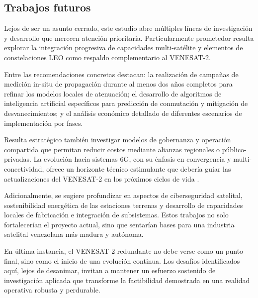 \subsection{Trabajos futuros}

Lejos de ser un asunto cerrado, este estudio abre múltiples líneas de investigación y desarrollo que merecen atención prioritaria. Particularmente prometedor resulta explorar la integración progresiva de capacidades multi-satélite y elementos de constelaciones LEO como respaldo complementario al VENESAT-2.

Entre las recomendaciones concretas destacan: la realización de campañas de medición in-situ de propagación durante al menos dos años completos para refinar los modelos locales de atenuación; el desarrollo de algoritmos de inteligencia artificial específicos para predicción de conmutación y mitigación de desvanecimientos; y el análisis económico detallado de diferentes escenarios de implementación por fases.

Resulta estratégico también investigar modelos de gobernanza y operación compartida que permitan reducir costos mediante alianzas regionales o público-privadas. La evolución hacia sistemas 6G, con su énfasis en convergencia y multi-conectividad, ofrece un horizonte técnico estimulante que debería guiar las actualizaciones del VENESAT-2 en los próximos ciclos de vida \cite{HTSSurvey2025}.

Adicionalmente, se sugiere profundizar en aspectos de ciberseguridad satelital, sostenibilidad energética de las estaciones terrenas y desarrollo de capacidades locales de fabricación e integración de subsistemas. Estos trabajos no solo fortalecerían el proyecto actual, sino que sentarían bases para una industria satelital venezolana más madura y autónoma.

En última instancia, el VENESAT-2 redundante no debe verse como un punto final, sino como el inicio de una evolución continua. Los desafíos identificados aquí, lejos de desanimar, invitan a mantener un esfuerzo sostenido de investigación aplicada que transforme la factibilidad demostrada en una realidad operativa robusta y perdurable.